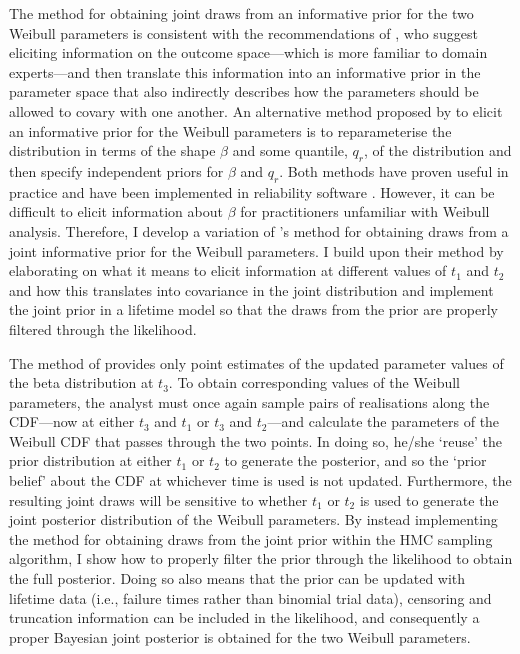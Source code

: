 The method for obtaining joint draws from an informative prior for the two Weibull parameters is consistent with the recommendations of \citet{gelman_workflow_2020}, who suggest eliciting information on the outcome space---which is more familiar to domain experts---and then translate this information into an informative prior in the parameter space that also indirectly describes how the parameters should be allowed to covary with one another. An alternative method proposed by \citet{Meeker2022} to elicit an informative prior for the Weibull parameters is to reparameterise the distribution in terms of the shape $\beta$ and some quantile, $q_r$, of the distribution and then specify independent priors for $\beta$ and $q_r$. Both methods have proven useful in practice and have been implemented in reliability software \citep{krivtsov2017}. However, it can be difficult to elicit information about $\beta$ for practitioners unfamiliar with Weibull analysis. Therefore, I develop a variation of \citeauthor{kaminskiy2005}'s method for obtaining draws from a joint informative prior for the Weibull parameters. I build upon their method by elaborating on what it means to elicit information at different values of $t_1$ and $t_2$ and how this translates into covariance in the joint distribution and implement the joint prior in a lifetime model so that the draws from the prior are properly filtered through the likelihood.

The method of \citet{kaminskiy2005} provides only point estimates of the updated parameter values of the beta distribution at $t_3$. To obtain corresponding values of the Weibull parameters, the analyst must once again sample pairs of realisations along the CDF---now at either $t_3$ and $t_1$ or $t_3$ and $t_2$---and calculate the parameters of the Weibull CDF that passes through the two points. In doing so, he/she `reuse' the prior distribution at either $t_1$ or $t_2$ to generate the posterior, and so the `prior belief' about the CDF at whichever time is used is not updated. Furthermore, the resulting joint draws will be sensitive to whether $t_1$ or $t_2$ is used to generate the joint posterior distribution of the Weibull parameters. By instead implementing the method for obtaining draws from the joint prior within the HMC sampling algorithm, I show how to properly filter the prior through the likelihood to obtain the full posterior. Doing so also means that the prior can be updated with lifetime data (i.e., failure times rather than binomial trial data), censoring and truncation information can be included in the likelihood, and consequently a proper Bayesian joint posterior is obtained for the two Weibull parameters. 

